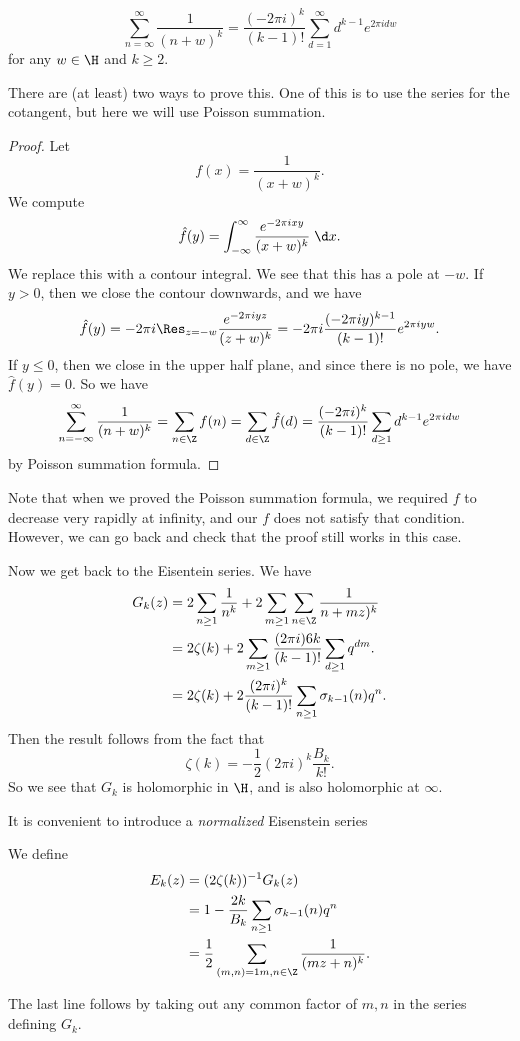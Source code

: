 \documentclass[a4paper]{article}
\begin{document}
\begin{lemma}
  \[
    \sum_{n = \infty}^\infty \frac{1}{(n + w)^k} = \frac{(-2\pi i)^k}{(k - 1)!} \sum_{d = 1}^\infty d^{k - 1} e^{2\pi i d w}
  \]
  for any $w \in \H$ and $k \geq 2$.
\end{lemma}
There are (at least) two ways to prove this. One of this is to use the series for the cotangent, but here we will use Poisson summation.

\begin{proof}
  Let
  \[
    f(x) = \frac{1}{(x + w)^k}.
  \]
  We compute
  \[
    \hat{f}(y) = \int_{-\infty}^\infty \frac{e^{-2\pi i x y}}{(x + w)^k}\;\d x.
  \]
  We replace this with a contour integral. We see that this has a pole at $-w$. If $y > 0$, then we close the contour downwards, and we have
  \[
    \hat{f}(y) = -2\pi i \Res_{z = -w} \frac{e^{-2\pi i y z}}{(z + w)^k} = -2\pi i \frac{(-2\pi i y)^{k - 1}}{(k - 1)!} e^{2\pi i yw}.
  \]
  If $y \leq 0$, then we close in the upper half plane, and since there is no pole, we have $\hat{f}(y) = 0$. So we have
  \[
    \sum_{n = -\infty}^\infty \frac{1}{(n + w)^k} = \sum_{n \in \Z} f(n) = \sum_{d \in \Z} \hat{f}(d) = \frac{(-2\pi i)^k}{(k - 1)!} \sum_{d \geq 1} d^{k - 1} e^{2\pi i d w}
  \]
  by Poisson summation formula.
\end{proof}

Note that when we proved the Poisson summation formula, we required $f$ to decrease very rapidly at infinity, and our $f$ does not satisfy that condition. However, we can go back and check that the proof still works in this case.

Now we get back to the Eisentein series. We have
\begin{align*}
  G_k(z) &= 2 \sum_{n \geq 1} \frac{1}{n^k} + 2 \sum_{m \geq 1} \sum_{n \in \Z} \frac{1}{n + mz)^k}\\
  &= 2 \zeta(k) + 2 \sum_{m \geq 1} \frac{(2\pi i )6k}{(k - 1)!} \sum_{d \geq 1} q^{dm}.\\
  &= 2 \zeta(k) + 2 \frac{(2\pi i)^k}{(k - 1)!} \sum_{n \geq 1} \sigma_{k - 1}(n) q^n.
\end{align*}
Then the result follows from the fact that
\[
  \zeta(k) = -\frac{1}{2} (2\pi i)^k \frac{B_k}{k!}.
\]
So we see that $G_k$ is holomorphic in $\H$, and is also holomorphic at $\infty$.

It is convenient to introduce a \emph{normalized} Eisenstein series
\begin{defi}
  We define
  \begin{align*}
    E_k(z) &= (2 \zeta(k))^{-1} G_k(z) \\
    &= 1 - \frac{2k}{B_k} \sum_{n \geq 1} \sigma_{k - 1}(n) q^n\\
    &= \frac{1}{2} \sum_{\substack{(m, n) = 1}{m, n \in \Z}} \frac{1}{(mz + n)^k}.
  \end{align*}
\end{defi}
The last line follows by taking out any common factor of $m, n$ in the series defining $G_k$.
\end{document}
